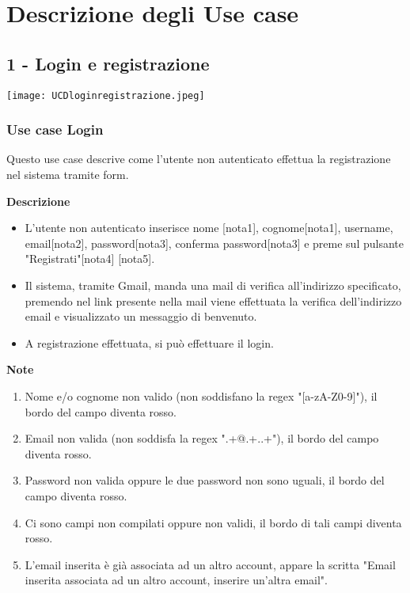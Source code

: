 \documentclass[a4paper,12pt]{article}
\begin{document}
\section*{Descrizione degli Use case }


\subsection*{1 - Login e registrazione}

\begin{center}
  \texttt{[image: UCDloginregistrazione.jpeg]}
\end{center}

\subsubsection*{Use case Login}

Questo use case descrive come l'utente non autenticato effettua la registrazione nel sistema tramite form.

\textbf{Descrizione}
\begin{itemize} \setlength\itemsep{0.01em}
\item L'utente non autenticato inserisce nome [nota1], cognome[nota1], username, email[nota2], password[nota3], conferma password[nota3] e preme sul pulsante "Registrati"[nota4] [nota5].
\item Il sistema, tramite Gmail, manda una mail di verifica all'indirizzo specificato, premendo nel link presente nella mail viene effettuata la verifica dell'indirizzo email e visualizzato un messaggio di benvenuto.
\item A registrazione effettuata, si può effettuare il login.
\end{itemize}

\textbf{Note}
\begin{enumerate} \setlength\itemsep{0.01em}
\item Nome e/o cognome non valido (non soddisfano la regex "[a-zA-Z0-9]"), il bordo del campo diventa rosso.
\item Email non valida (non soddisfa la regex ".+@.+..+"), il bordo del campo diventa rosso.
\item Password non valida oppure le due password non sono uguali, il bordo del campo diventa rosso.
\item Ci sono campi non compilati oppure non validi, il bordo di tali campi diventa rosso.
\item L'email inserita è già associata ad un altro account, appare la scritta "Email inserita associata ad un altro account, inserire un'altra email".
\end{enumerate}
\end{document}
